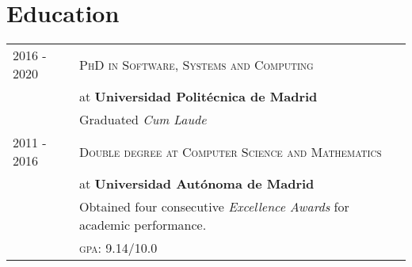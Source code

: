 \documentclass[a4paper,10pt]{article} %
\begin{document}
\section{Education}
\begin{tabular}{p{2.5cm}p{13.2cm}}
\small{2016 - 2020} & \textsc{PhD in Software, Systems and Computing} \\
& at \textbf{Universidad Politécnica de Madrid}\\
& Graduated \emph{Cum Laude} \\
[3pt]
\small{2011 - 2016} & \textsc{Double degree at Computer Science and Mathematics}\\
& at \textbf{Universidad Autónoma de Madrid} \\
& Obtained four consecutive \emph{Excellence Awards} for academic performance. \\
& \normalsize \textsc{gpa}: 9.14/10.0
\end{tabular}
\end{document}
